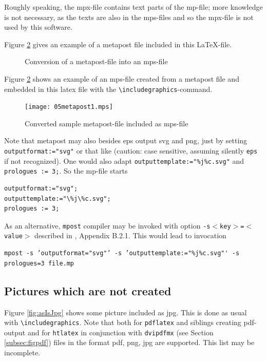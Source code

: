 \documentclass[12pt]{article}
\begin{document}
Roughly speaking, the mpx-file contains text parts of the mp-file; 
more knowledge is not necessary, as the texts are also in the mps-files 
and so the mpx-file is not used by this software. 

Figure \ref{fig:metapost} gives an example of a metapost file 
included in this LaTeX-file. 

\begin{figure}[htb]
\begin{center}

\end{center}
\caption{\label{fig:mp2mps}Conversion of a metapost-file into an mps-file}
\end{figure}

Figure \ref{fig:metapost} shows an example of an mps-file 
created from a metapost file 
and embedded in this latex file 
with the {\tt\textbackslash includegraphics}-command. 

\begin{figure}[htb]
\begin{center}
\texttt{[image: 05metapost1.mps]}
\end{center}
\caption{\label{fig:metapost}
Converted sample metapost-file included as mps-file  }
\end{figure}

Note that metapost may also besides eps output svg and png, 
just by setting {\tt outputformat:="svg"} or that like 
(caution: case sensitive, assuming silently {\tt eps} if not recognized). 
One would also adapt {\tt outputtemplate:="\%j\%c.svg"} 
and {\tt prologues := 3;}. 
So the mp-file starts 
%
\begin{lstlisting}[language=metapost]
outputformat:="svg";
outputtemplate:="\%j\%c.svg";
prologues := 3;
\end{lstlisting}

As an alternative, {\tt mpost} compiler may be invoked with option 
{\tt -s$<$key$>$=$<$value$>$} described in \cite{MPost}, Appendix B.2.1. 
This would lead to invocation 
%
\begin{lstlisting}
mpost -s ’outputformat="svg"’ -s ’outputtemplate:="%j%c.svg"' -s prologues=3 file.mp
\end{lstlisting}

\subsection{Pictures which are not created}\label{subsec:picasis}

Figure \ref{fig:asIsJpg} shows some picture included as jpg. 
This is done as usual with {\tt\textbackslash includegraphics}. 
Note that both for {\tt pdflatex} and siblings creating pdf-output 
and for {\tt htlatex} in conjunction with {\tt dvipdfmx} 
(see Section \ref{subsec:figpdf}) 
files in the format pdf, png, jpg are supported. 
This list may be incomplete. 
\end{document}
